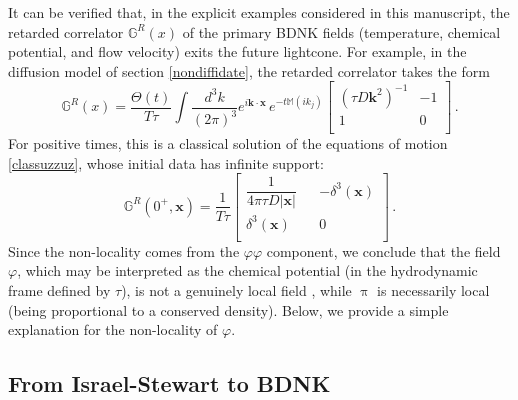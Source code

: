 \documentclass[a4paper, amsfonts, amssymb, amsmath, reprint, showkeys, nofootinbib, twoside,notitlepage,onecolumn]{revtex4-2}
\newcommand{\Ma}{{\mathbb{M}}}
\newcommand{\Ga}{{\mathbb{G}}}
\theoremstyle{definition}
\begin{document}
It can be verified that, in the explicit examples considered in this manuscript, the retarded correlator $\Ga^R(x)$ of the primary BDNK fields (temperature, chemical potential, and flow velocity) exits the future lightcone. For example, in the diffusion model of section \ref{nondiffidate}, the retarded correlator takes the form
\begin{equation}
    \Ga^R(x) = \dfrac{\Theta(t)}{T\tau} \int \dfrac{d^3 k}{(2\pi)^3} e^{i\textbf{k}\cdot \textbf{x}} \, e^{-t\Ma(ik_j)}
    \begin{bmatrix}
        (\tau D \textbf{k}^2)^{-1} & -1 \\
        1 & 0 \\
    \end{bmatrix} \, .
\end{equation}
For positive times, this is a classical solution of the equations of motion \eqref{classuzzuz}, whose initial data has infinite support:
\begin{equation}
    \Ga^R(0^+,\textbf{x})=  \dfrac{1}{T\tau} \begin{bmatrix}
        \dfrac{1}{4\pi \tau D |\textbf{x}|} & & -\delta^3(\textbf{x}) \\
        \delta^3(\textbf{x}) & & 0 \\ 
    \end{bmatrix}\, .
\end{equation}
Since the non-locality comes from the $\varphi \varphi$ component, we conclude that the field $\varphi$, which may be interpreted as the chemical potential (in the hydrodynamic frame defined by $\tau$), is not a genuinely local field \cite{HellerBounds2022}, while $\uppi$ is necessarily local (being proportional to a conserved density). Below, we provide a simple explanation for the non-locality of $\varphi$.

\subsection{From Israel-Stewart to BDNK}\label{Istobdnk!!}
\end{document}
